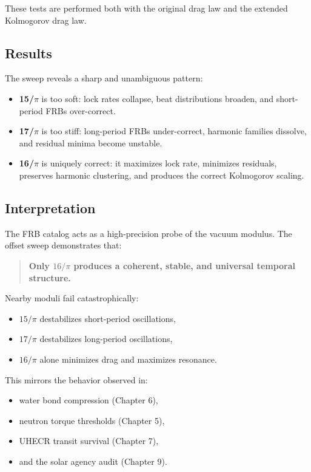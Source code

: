 \documentclass[11pt, letterpaper, openany]{book}
\begin{document}
These tests are performed both with the original drag law and the extended Kolmogorov drag law.

\subsection*{Results}

The sweep reveals a sharp and unambiguous pattern:

\begin{itemize}
    \item \textbf{15/$\pi$} is too soft:  
    lock rates collapse, beat distributions broaden, and short-period FRBs over-correct.

    \item \textbf{17/$\pi$} is too stiff:  
    long-period FRBs under-correct, harmonic families dissolve, and residual minima become unstable.

    \item \textbf{16/$\pi$} is uniquely correct:  
    it maximizes lock rate, minimizes residuals, preserves harmonic clustering,  
    and produces the correct Kolmogorov scaling.
\end{itemize}

\subsection*{Interpretation}

The FRB catalog acts as a high-precision probe of the vacuum modulus.  
The offset sweep demonstrates that:

\begin{quote}
\textbf{Only $16/\pi$ produces a coherent, stable, and universal temporal structure.}
\end{quote}

Nearby moduli fail catastrophically:

\begin{itemize}
    \item $15/\pi$ destabilizes short-period oscillations,
    \item $17/\pi$ destabilizes long-period oscillations,
    \item $16/\pi$ alone minimizes drag and maximizes resonance.
\end{itemize}

This mirrors the behavior observed in:

\begin{itemize}
    \item water bond compression (Chapter 6),
    \item neutron torque thresholds (Chapter 5),
    \item UHECR transit survival (Chapter 7),
    \item and the solar agency audit (Chapter 9).
\end{itemize}
\end{document}
